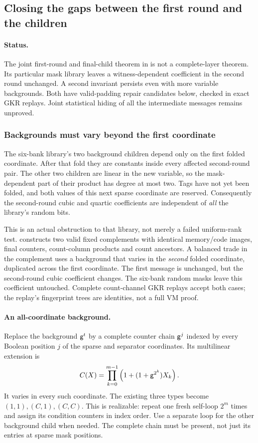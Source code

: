 \subsection{Closing the gaps between the first round and the children}\label{note:zk-count-middle-rounds}

\paragraph{Status.} The joint first-round and final-child theorem in  is not a complete-layer theorem. Its particular mask library leaves a witness-dependent coefficient in the second round unchanged. A second invariant persists even with more variable backgrounds. Both have valid-padding repair candidates below, checked in exact GKR replays. Joint statistical hiding of all the intermediate messages remains unproved.

\subsubsection{Backgrounds must vary beyond the first coordinate}

The six-bank library's two background children depend only on the first folded coordinate. After that fold they are constants inside every affected second-round pair. The other two children are linear in the new variable, so the mask-dependent part of their product has degree at most two. Tags have not yet been folded, and both values of this next sparse coordinate are reserved. Consequently the second-round cubic and quartic coefficients are independent of \emph{all} the library's random bits.

This is an actual obstruction to that library, not merely a failed uniform-rank test.  constructs two valid fixed complements with identical memory/code images, final counters, count-column products and count ancestors. A balanced trade in the complement uses a background that varies in the \emph{second} folded coordinate, duplicated across the first coordinate. The first message is unchanged, but the second-round cubic coefficient changes. The six-bank random masks leave this coefficient untouched. Complete count-channel GKR replays accept both cases; the replay's fingerprint trees are identities, not a full VM proof.

\paragraph{An all-coordinate background.} Replace the background $\mathsf{g}^t$ by a complete counter chain $\mathsf{g}^j$ indexed by every Boolean position $j$ of the sparse and separator coordinates. Its multilinear extension is
\[
 C(X)=\prod_{k=0}^{m-1}\left(1+(1+\mathsf{g}^{2^k})X_k\right).
\]
It varies in every such coordinate. The existing three types become $(1,1),(C,1),(C,C)$. This is realizable: repeat one fresh self-loop $2^m$ times and assign its condition counters in index order. Use a separate loop for the other background child when needed. The complete chain must be present, not just its entries at sparse mask positions.

